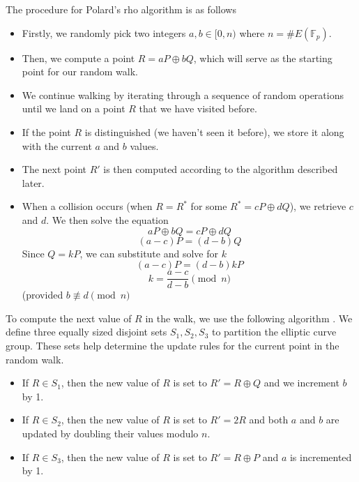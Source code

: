 \documentclass[11pt]{article}
\begin{document}
The procedure for Polard's rho algorithm is as follows \cite{gill}
\begin{itemize}
    \item Firstly, we randomly pick two integers \(a,b\in[0, n)\) where \(n=\#E(\mathbb{F}_p)\).
    
    \item Then, we compute a point \(R=aP\oplus bQ\), which will serve as the starting point for our random walk.
    
    \item We continue walking by iterating through a sequence of random operations until we land on a point \(R\) that we have visited before.
    
    \item If the point \(R\) is distinguished (we haven't seen it before), we store it along with the current \(a\) and \(b\) values.
    
    \item The next point \(R'\) is then computed according to the algorithm described later.
    
    \item When a collision occurs (when \(R=R^*\) for some \(R^*=cP\oplus dQ\)), we retrieve \(c\) and \(d\). We then solve the equation
    \[aP\oplus bQ=cP\oplus dQ\]
    \[(a-c)P=(d-b)Q\]
    Since \(Q=kP\), we can substitute and solve for \(k\)
    \[(a-c)P=(d-b)kP\]
    \[k = \frac{a-c}{d-b} \pmod n\]
    (provided \(b\not\equiv d \pmod n\)
\end{itemize}

To compute the next value of \(R\) in the walk, we use the following algorithm \cite{gill}. We define three equally sized disjoint sets \(S_1, S_2,S_3\) to partition the elliptic curve group. These sets help determine the update rules for the current point in the random walk.
\begin{itemize}
    \item If \(R\in S_1\), then the new value of \(R\) is set to \(R'=R\oplus Q\) and we increment \(b\) by 1.
    
    \item If \(R\in S_2\), then the new value of \(R\) is set to \(R'=2R\) and both \(a\) and \(b\) are updated by doubling their values modulo \(n\).
    
    \item If \(R\in S_3\), then the new value of \(R\) is set to \(R'=R\oplus P\) and \(a\) is incremented by 1.
\end{itemize}
\end{document}
